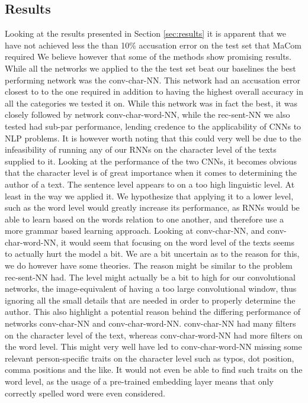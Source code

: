 \subsection{Results}

Looking at the results presented in Section \ref{sec:results} it is apparent
that we have not achieved less the than 10\% accusation error on the test
set that MaCom required We believe however that some of the methods show
promising results. While all the networks we applied to the the test set beat
our baselines the best performing network was the \gls{conv-char-NN}. This
network had an accusation error closest to to the one required in addition to
having the highest overall accuracy in all the categories we tested it on.
While this network was in fact the best, it was closely followed by network
\gls{conv-char-word-NN}, while the \gls{rec-sent-NN} we also tested had sub-par
performance, lending credence to the applicability of \gls{CNN}s to \gls{NLP}
problems. It is however worth noting that this could very well be due to the
infeasibility of running any of our \gls{RNN}s on the character level of the
texts supplied to it. Looking at the performance of the two \gls{CNN}s, it
becomes obvious that the character level is of great importance when it comes
to determining the author of a text. The sentence level appears to on a too
high linguistic level. At least in the way we applied it. We hypothesize that
applying it to a lower level, such as the word level would greatly increase its
performance, as \gls{RNN}s would be able to learn based on the words relation to
one another, and therefore use a more grammar based learning approach. Looking
at \gls{conv-char-NN}, and \gls{conv-char-word-NN}, it would seem that focusing
on the word level of the texts seems to actually hurt the model a bit. We are a
bit uncertain as to the reason for this, we do however have some theories. The
reason might be similar to the problem \gls{rec-sent-NN} had. The level might
actually be a bit to high for our convolutional networks, the image-equivalent
of having a too large convolutional window, thus ignoring all the small details
that are needed in order to properly determine the author. This also highlight a
potential reason behind the differing performance of networks \gls{conv-char-NN}
and \gls{conv-char-word-NN}. \gls{conv-char-NN} had many filters on the
character level of the text, whereas \gls{conv-char-word-NN} had more filters on
the word level. This might very well have led to \gls{conv-char-word-NN} missing
some relevant person-specific traits on the character level such as typos, dot
position, comma positions and the like. It would not even be able to find such
traits on the word level, as the usage of a pre-trained embedding layer means
that only correctly spelled word were even considered.

